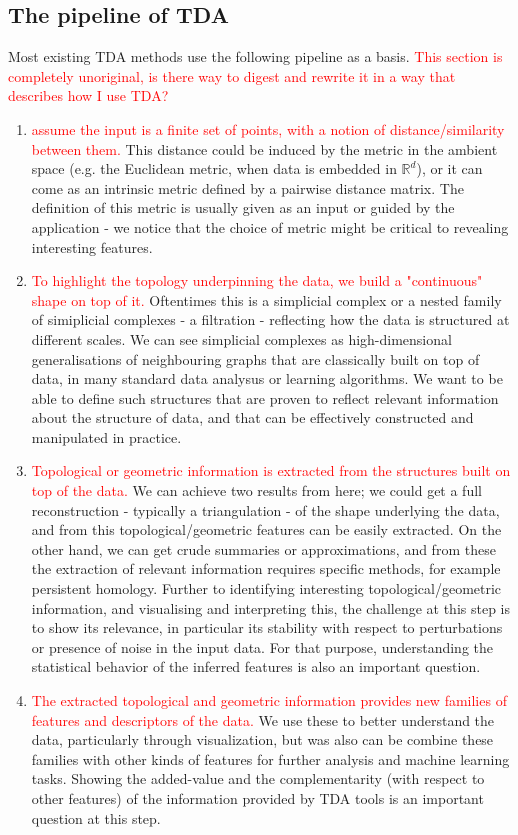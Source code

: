 \documentclass[a4paper]{article}
\begin{document}
\subsection*{The pipeline of TDA}
Most existing TDA methods use the following pipeline as a basis. \textcolor{red}{This section is completely unoriginal, is there way to digest and rewrite it in a way that describes how I use TDA?}
\begin{enumerate}
\item \textcolor{red}{ assume the input is a finite set of points, with a notion of distance/similarity between them.} This distance could be induced by the metric in the ambient space (e.g. the Euclidean metric, when data is embedded in $\mathbb{R}^{d}$), or it can come as an intrinsic metric defined by a pairwise distance matrix. The definition of this metric is usually given as an input or guided by the application - we notice that the choice of metric might be critical to revealing interesting features.
\item \textcolor{red}{To highlight the topology underpinning the data, we build a "continuous" shape on top of it.} Oftentimes this is a simplicial complex or a nested family of simiplicial complexes - a filtration - reflecting how the data is structured at different scales. We can see simplicial complexes as high-dimensional generalisations of neighbouring graphs that are classically built on top of data, in many standard data analysus or learning algorithms. We want to be able to define such structures that are proven to reflect relevant information about the structure of data, and that can be effectively constructed and manipulated in practice.
\item \textcolor{red}{Topological or geometric information is extracted from the structures built on top of the data.} We can achieve two results from here; we could get a full reconstruction - typically a triangulation - of the shape underlying the data, and from this topological/geometric features can be easily extracted. On the other hand, we can get crude summaries or approximations, and from these the extraction of relevant information requires specific methods, for example persistent homology. Further to identifying interesting topological/geometric information, and visualising and interpreting this, the challenge at this step is to show its relevance, in particular its stability with respect to perturbations or presence of noise in the input data. For that purpose, understanding the statistical behavior of the inferred features is also an important question.
\item \textcolor{red}{The extracted topological and geometric information provides new families of features and descriptors of the data.} We use these to better understand the data, particularly through visualization, but was also can be combine these families with other kinds of features for further analysis and machine learning tasks. Showing the added-value and the complementarity (with respect to other features) of the information provided by TDA tools is an important question at this step.
\end{enumerate}
\end{document}
